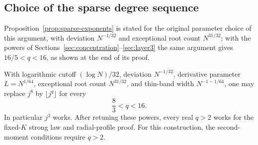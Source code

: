 \subsection{Choice of the sparse degree sequence}
Proposition~\ref{prop:sparse-exponents} is stated for the original
parameter choice of this argument, with deviation $N^{-1/32}$ and
exceptional root count $N^{31/32}$; with the powers of
Sections~\ref{sec:concentration}--\ref{sec:layer3} the same argument gives
$16/5<q<16$, as shown at the end of its proof.
\begin{proposition}\label{prop:sparse-exponents}
With logarithmic cutoff $(\log N)/32$, deviation $N^{-1/32}$,
derivative parameter $L=N^{1/64}$, exceptional root count $N^{31/32}$,
and thin-band width $N^{-1-1/64}$, one may replace $j^8$ by
$\lfloor j^q\rfloor$ for every
\[
                         \frac83<q<16.
\]
In particular $j^3$ works. After retuning these powers, every real
$q>2$ works for the fixed-$K$ strong law and radial-profile proof.
For this construction, the second-moment conditions require $q>2$.
\end{proposition}
